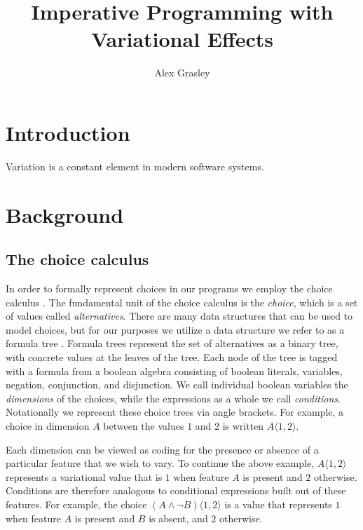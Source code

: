 \documentclass[letterpaper,10pt,onecolumn]{article}
\title{Imperative Programming with Variational Effects}
\author{Alex Grasley}
\newcommand{\tagtree}[3]{#1 \langle #2, #3 \rangle}
\begin{document}
\maketitle

\section{Introduction}

Variation is a constant element in modern software systems. 

\section{Background}

\subsection{The choice calculus}

In order to formally represent choices in our programs we employ the choice
calculus \cite{ericthesis,erwig2011choice}. The fundamental unit of the choice calculus is
the \emph{choice}, which is a set of values called \emph{alternatives}.
There are many data structures that can be used to model
choices, but for our purposes we utilize a data structure we refer
to as a formula tree \cite{walkingshaw2014projectional,walkingshaw2014variational}.
Formula trees represent the set of alternatives as a binary tree, with concrete
values at the leaves of the tree. Each node of the tree is tagged with a formula from a boolean
algebra consisting of boolean literals, variables, negation, conjunction, and disjunction. We call individual
boolean variables the \emph{dimensions} of the choices, while the expressions as a whole we call \emph{conditions}. Notationally we represent these choice trees
via angle brackets. For example, a choice in dimension $A$
between the values $1$ and $2$ is written $\tagtree{A}{1}{2}$.

Each dimension can be viewed as coding for the presence or absence of a
particular feature that we wish to vary. To continue the above example, $\tagtree{A}{1}{2}$
represents a variational value that is $1$ when feature $A$ is present and $2$ otherwise. Conditions
are therefore analogous to conditional expressions built out of these features. For example, the choice $\tagtree{(A \wedge \neg B)}{1}{2}$
is a value that represents $1$ when feature $A$ is present and $B$ is absent, and $2$ otherwise.
\end{document}

